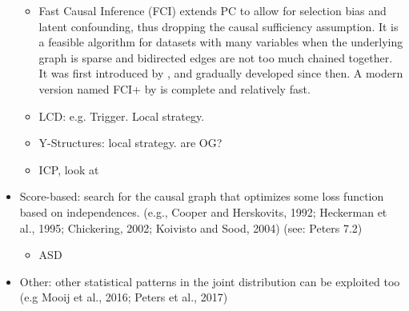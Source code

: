 \begin{itemize}
\begin{itemize}
            \item Fast Causal Inference (FCI) extends PC to allow for selection bias and latent confounding, thus dropping the causal sufficiency assumption. It is a feasible algorithm for datasets with many variables when the underlying graph is sparse and bidirected edges are not too much chained together. It was first introduced by \citet{spirtes1999algorithm}, and gradually developed since then. A modern version named FCI+ by \citet{claassen2013learning} is complete and relatively fast.
            
            


            \item LCD: e.g. Trigger\citep{chen2007harnessing}. Local strategy.
            \item Y-Structures: local strategy. \citet{mooij2015empirical} are OG?
            \item ICP, look at \citet{meinshausen2016methods}
        \end{itemize}
    
    \item Score-based: search for the causal graph that optimizes some loss function based on independences.  (e.g., Cooper and Herskovits,
    1992; Heckerman et al., 1995; Chickering, 2002; Koivisto and Sood, 2004) (see: Peters 7.2)
        \begin{itemize}
            \item ASD
        \end{itemize}

    \item Other: other statistical patterns in the joint distribution can be exploited too (e.g Mooij et al., 2016; Peters et al., 2017)
\end{itemize}
